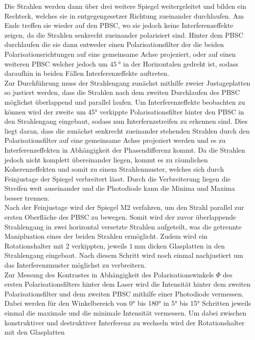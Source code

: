 Die Strahlen werden dann über drei weitere Spiegel weitergeleitet und bilden ein Rechteck, welches
sie in entgegengesetzer Richtung zueinander durchlaufen. Am Ende treffen sie wieder auf den
PBSC, wo sie jedoch keine Interferenzeffekte zeigen, da die Strahlen senkrecht zueinander polarisiert sind.
Hinter dem PBSC durchlaufen die sie dann entweder einen Polarisationsfilter der die beiden
Polarisationsrichtungen auf eine gemeinsame Achse projeziert, oder auf einen weiteren PBSC
welcher jedoch um $\SI{45}{\degree}$ in der Horizontalen gedreht ist,
sodass daraufhin in beiden Fällen Interferenzeffekte auftreten.\\
Zur Durchführung muss der Strahlengang zunächst mithilfe zweier Justageplatten so justiert werden,
dass die Strahlen nach dem zweiten Durchlaufen des PBSC möglichst überlappend und parallel laufen.
Um Interferenzeffekte beobachten zu können wird der zweite um 45° verkippte
Polarisationsfilter hinter den PBSC in den
Strahlengang eingebaut, sodass nun Interfernzstreifen zu erkennen sind.
Dies liegt daran, dass die zunächst senkrecht zueinander stehenden Strahlen durch den
Polarisationsfilter auf eine gemeinsame Achse projeziert werden und es zu Interferenzeffekten
in Abhängigkeit der Phasendifferenz kommt.
Da die Strahlen jedoch nicht komplett übereinander liegen, kommt es zu räumlichen Koherenzeffekten
und somit zu einem Strahlenmuster, welches sich durch Feinjustage der Spiegel verbreitert lässt.
Durch die Verbreiterung liegen die Streifen weit auseinander und die Photodiode kann
die Minima und Maxima besser trennen.\\
Nach der Feinjustage wird der Spiegel M2 verfahren, um den Strahl parallel zur ersten Oberfläche des PBSC zu bewegen.
Somit wird
der zuvor überlappende Strahlengang in zwei horizontal versetzte Strahlen aufgeteilt, was die getrennte
Manipluation eines der beiden Strahlen ermöglicht. Zudem
wird ein Rotationshalter mit 2 verkippten, jeweils $\SI{1}{\milli\metre}$ dicken Glasplatten
in den Strahlengang eingebaut.
Nach diesem Schritt wird noch einmal nachjustiert um
das Interferenzmuster möglichst zu verbreitern.\\
Zur Messung des Kontrastes in Abhängigkeit des Polarisationswinkels $\Phi$ des ersten
Polarisationsfilters hinter dem Laser wird die Intensität hinter dem zweiten
Polarisationsfilter und dem zweiten PBSC mithilfe einer Photodiode vermessen. Dabei werden für den Winkelbereich von
0° bis 180° in 5° bis 15° Schritten jeweils einmal die maximale und die minimale Intensität vermessen. Um dabei
zwischen konstruktiver und destruktiver Interferenz zu wechseln wird der Rotationshalter mit den Glasplatten
